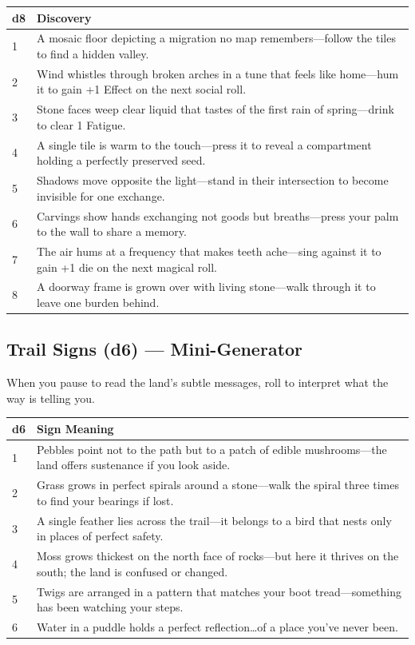 \begin{longtable}{|p{1.5cm}|p{10cm}|}
\hline
\rowcolor{gray!20}
\textbf{d8} & \textbf{Discovery} \\
\hline
1 & A mosaic floor depicting a migration no map remembers---follow the tiles to find a hidden valley. \\
\hline
2 & Wind whistles through broken arches in a tune that feels like home---hum it to gain +1 Effect on the next social roll. \\
\hline
3 & Stone faces weep clear liquid that tastes of the first rain of spring---drink to clear 1 Fatigue. \\
\hline
4 & A single tile is warm to the touch---press it to reveal a compartment holding a perfectly preserved seed. \\
\hline
5 & Shadows move opposite the light---stand in their intersection to become invisible for one exchange. \\
\hline
6 & Carvings show hands exchanging not goods but breaths---press your palm to the wall to share a memory. \\
\hline
7 & The air hums at a frequency that makes teeth ache---sing against it to gain +1 die on the next magical roll. \\
\hline
8 & A doorway frame is grown over with living stone---walk through it to leave one burden behind. \\
\hline
\end{longtable}

\subsection*{Trail Signs (d6) --- Mini-Generator}
\label{sec:wilderness-trail-signs}
When you pause to read the land's subtle messages, roll to interpret what the way is telling you.

\begin{longtable}{|p{1.5cm}|p{10cm}|}
\hline
\rowcolor{gray!20}
\textbf{d6} & \textbf{Sign Meaning} \\
\hline
1 & Pebbles point not to the path but to a patch of edible mushrooms---the land offers sustenance if you look aside. \\
\hline
2 & Grass grows in perfect spirals around a stone---walk the spiral three times to find your bearings if lost. \\
\hline
3 & A single feather lies across the trail---it belongs to a bird that nests only in places of perfect safety. \\
\hline
4 & Moss grows thickest on the north face of rocks---but here it thrives on the south; the land is confused or changed. \\
\hline
5 & Twigs are arranged in a pattern that matches your boot tread---something has been watching your steps. \\
\hline
6 & Water in a puddle holds a perfect reflection\dots of a place you've never been. \\
\hline
\end{longtable}

